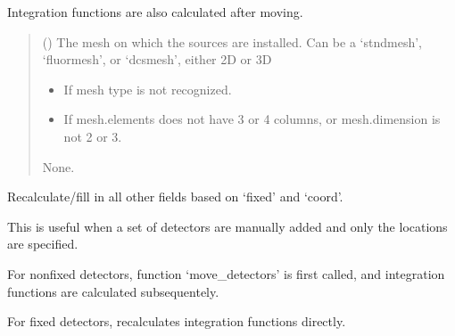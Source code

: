 \documentclass[letterpaper,10pt,english]{sphinxmanual}
\begin{document}
\begin{fulllineitems}
\begin{fulllineitems}
\sphinxAtStartPar
Integration functions are also calculated after moving.
\begin{quote}\begin{description}
\sphinxAtStartPar
{} () \textendash{} The mesh on which the sources are installed. Can be a ‘stndmesh’, ‘fluormesh’, or ‘dcsmesh’, either 2D or 3D

\begin{itemize}
\item {} 
\sphinxAtStartPar
{} \textendash{} If mesh type is not recognized.

\item {} 
\sphinxAtStartPar
{} \textendash{} If mesh.elements does not have 3 or 4 columns, or mesh.dimension is not 2 or 3.

\end{itemize}

\sphinxAtStartPar
None.

\end{description}\end{quote}

\end{fulllineitems}


\begin{fulllineitems}
\label{\detokenize{_autosummary/nirfasterff.base.optodes.optode:nirfasterff.base.optodes.optode.touch_detectors}}
\pysigstartsignatures
{}
\pysigstopsignatures
\sphinxAtStartPar
Recalculate/fill in all other fields based on ‘fixed’ and ‘coord’.

\sphinxAtStartPar
This is useful when a set of detectors are manually added and only the locations are specified.

\sphinxAtStartPar
For non\sphinxhyphen{}fixed detectors, function ‘move\_detectors’ is first called, and integration functions are calculated subsequentely.

\sphinxAtStartPar
For fixed detectors, recalculates integration functions directly.


\end{fulllineitems}
\end{fulllineitems}
\end{document}
